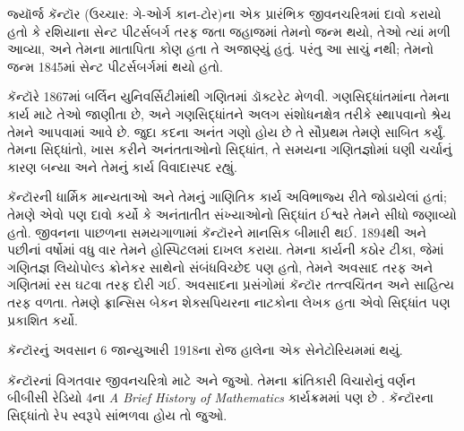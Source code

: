 
\label{guunit:OLP-0620}


\begingroup
\makeatletter{}\makeatother

\label{guunit:OLP-0621}


\begingroup
\makeatletter{}\makeatother


\label{guunit:OLP-0622}



જ્યૉર્જ કૅન્ટૉર (ઉચ્ચાર: ગે-ઓર્ગ કાન-ટોર)ના
એક પ્રારંભિક જીવનચરિત્રમાં
દાવો કરાયો હતો કે રશિયાના સેન્ટ પીટર્સબર્ગ તરફ
જતા જહાજમાં તેમનો જન્મ થયો, તેઓ ત્યાં મળી આવ્યા,
અને તેમના માતાપિતા કોણ હતા તે અજાણ્યું હતું.
પરંતુ આ સાચું નથી; તેમનો જન્મ 1845માં સેન્ટ
પીટર્સબર્ગમાં થયો હતો.

કૅન્ટૉરે 1867માં બર્લિન યુનિવર્સિટીમાંથી
ગણિતમાં ડૉક્ટરેટ મેળવી. ગણસિદ્ધાંતમાંના તેમના
કાર્ય માટે તેઓ જાણીતા છે, અને ગણસિદ્ધાંતને
અલગ સંશોધનક્ષેત્ર તરીકે સ્થાપવાનો શ્રેય તેમને
આપવામાં આવે છે. જુદા કદના અનંત ગણો હોય છે
તે સૌપ્રથમ તેમણે સાબિત કર્યું. તેમના સિદ્ધાંતો,
ખાસ કરીને અનંતતાઓનો સિદ્ધાંત, તે સમયના
ગણિતજ્ઞોમાં ઘણી ચર્ચાનું કારણ બન્યા અને તેમનું
કાર્ય વિવાદાસ્પદ રહ્યું.

કૅન્ટૉરની ધાર્મિક માન્યતાઓ અને તેમનું ગાણિતિક
કાર્ય અવિભાજ્ય રીતે જોડાયેલાં હતાં; તેમણે
એવો પણ દાવો કર્યો કે અનંતાતીત સંખ્યાઓનો
સિદ્ધાંત ઈશ્વરે તેમને સીધો જણાવ્યો હતો.
જીવનના પાછળના સમયગાળામાં કૅન્ટૉરને માનસિક
બીમારી થઈ. 1894થી અને પછીનાં વર્ષોમાં વધુ
વાર તેમને હોસ્પિટલમાં દાખલ કરાયા. તેમના
કાર્યની કઠોર ટીકા, જેમાં ગણિતજ્ઞ લિયોપોલ્ડ
ક્રોનેકર સાથેનો સંબંધવિચ્છેદ પણ હતો, તેમને
અવસાદ તરફ અને ગણિતમાં રસ ઘટવા તરફ દોરી ગઈ.
અવસાદના પ્રસંગોમાં કૅન્ટૉર તત્ત્વચિંતન અને
સાહિત્ય તરફ વળતા. તેમણે ફ્રાન્સિસ બેકન
શેક્સપિયરના નાટકોના લેખક હતા એવો સિદ્ધાંત
પણ પ્રકાશિત કર્યો.

કૅન્ટૉરનું અવસાન 6 જાન્યુઆરી 1918ના રોજ
હાલેના એક સેનેટોરિયમમાં થયું.

\begin{reading}
કૅન્ટૉરનાં વિગતવાર જીવનચરિત્રો માટે
\citet{Dauben1990} અને
\citet{Grattan-Guinness1971} જુઓ. તેમના
ક્રાંતિકારી વિચારોનું વર્ણન બીબીસી રેડિયો 4ના
\emph{A Brief History of
  Mathematics} કાર્યક્રમમાં પણ છે
\citep{Sautoy2014}. કૅન્ટૉરના સિદ્ધાંતો
રેપ સ્વરૂપે સાંભળવા હોય તો \citet{Rose2012} જુઓ.
\end{reading}
\endgroup


